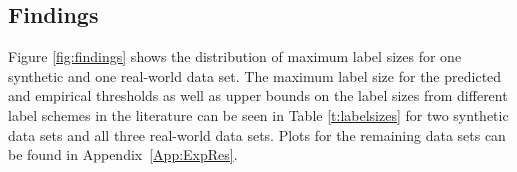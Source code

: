 %


\subsection{Findings}
Figure \ref{fig:findings} shows the distribution of maximum label sizes for one synthetic and one real-world data set. The maximum label size
for the predicted and empirical thresholds as well as upper bounds on the label sizes from different label schemes in the literature can be seen in Table \ref{t:labelsizes} for two synthetic
data sets and all three real-world data sets. 
Plots for the remaining data sets can be found in Appendix~\ref{App:ExpRes}.

